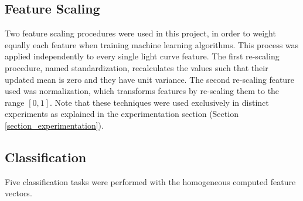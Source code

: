 \documentclass[a4paper,fleqn,usenatbib]{mnras}
\begin{document}
\subsection{Feature Scaling} \label{subsection_scaling}
Two feature scaling procedures were used in this project, in order to weight equally each feature when training machine learning algorithms. This process was applied independently to every single light curve feature. The first re-scaling procedure, named standardization, recalculates the values such that their updated mean is zero and they have unit variance. The second re-scaling feature used was normalization, which transforms features by re-scaling them to the range $[0,1]$. Note that these techniques were used exclusively in distinct experiments as explained in the experimentation section (Section \ref{section_experimentation}).

\subsection{Classification} \label{subsection_classification}

Five classification tasks were performed with the homogeneous computed feature vectors.
\end{document}
